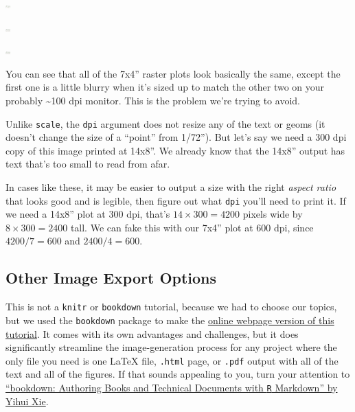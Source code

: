 \documentclass[
]{book}
\begin{document}
\begin{center}\includegraphics[width=7px]{img/penalty-lift-png-50dpi} \end{center}

\begin{center}\includegraphics[width=7px]{img/penalty-lift-png-300dpi} \end{center}

\begin{center}\includegraphics[width=7px]{img/penalty-lift-png-500dpi} \end{center}

You can see that all of the 7x4'' raster plots look basically the same, except the first one is a little blurry when it's sized up to match the other two on your probably \textasciitilde100 dpi monitor. This is the problem we're trying to avoid.

Unlike \texttt{scale}, the \texttt{dpi} argument does not resize any of the text or geoms (it doesn't change the size of a ``point'' from 1/72''). But let's say we need a 300 dpi copy of this image printed at 14x8''. We already know that the 14x8'' output has text that's too small to read from afar.

In cases like these, it may be easier to output a size with the right \emph{aspect ratio} that looks good and is legible, then figure out what \texttt{dpi} you'll need to print it. If we need a 14x8'' plot at 300 dpi, that's \(14 \times 300 = 4200\) pixels wide by \(8 \times 300 = 2400\) tall. We can fake this with our 7x4'' plot at 600 dpi, since \(4200 / 7 = 600\) and \(2400 / 4 = 600\).

\hypertarget{other-image-export-options}{%
\subsection{Other Image Export Options}\label{other-image-export-options}}

This is not a \texttt{knitr} or \texttt{bookdown} tutorial, because we had to choose our topics, but we used the \texttt{bookdown} package to make the \href{https://lhami.github.io/sensometrics-r-tutorial-2024/}{online webpage version of this tutorial}. It comes with its own advantages and challenges, but it does significantly streamline the image-generation process for any project where the only file you need is one LaTeX file, \texttt{.html} page, or \texttt{.pdf} output with all of the text and all of the figures. If that sounds appealing to you, turn your attention to \href{https://bookdown.org/yihui/bookdown/}{``bookdown: Authoring Books and Technical Documents with \texttt{R} Markdown'' by Yihui Xie}.
\end{document}
